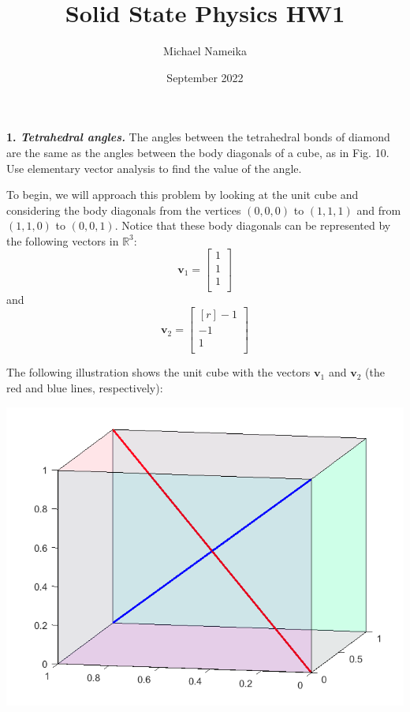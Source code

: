 \documentclass{article}
\title{Solid State Physics HW1}
\author{Michael Nameika}
\date{September 2022}
\begin{document}
\maketitle

\textbf{1. \textit{Tetrahedral angles.}} The angles between the tetrahedral bonds of diamond are the same as the angles between the body diagonals of a cube, as in Fig. 10. Use elementary vector analysis to find the value of the angle.
\newline\newline


To begin, we will approach this problem by looking at the unit cube and considering the body diagonals from the vertices $(0,0,0)$ to $(1,1,1)$ and from $(1,1,0)$ to $(0,0,1)$. Notice that these body diagonals can be represented by the following vectors in $\mathbb{R}^3$:
\[\textbf{v}_1 = \begin{bmatrix}
    1\\
    1\\
    1\\
\end{bmatrix}\]
and
\[\textbf{v}_2 = \begin{bmatrix*}[r]
    -1\\
    -1\\
    1\\
\end{bmatrix*}\]

The following illustration shows the unit cube with the vectors $\textbf{v}_1$ and $\textbf{v}_2$ (the red and blue lines, respectively):

\begin{center}
    \includegraphics[scale = 0.6]{UNITCUBE.png}
\end{center}
\end{document}
